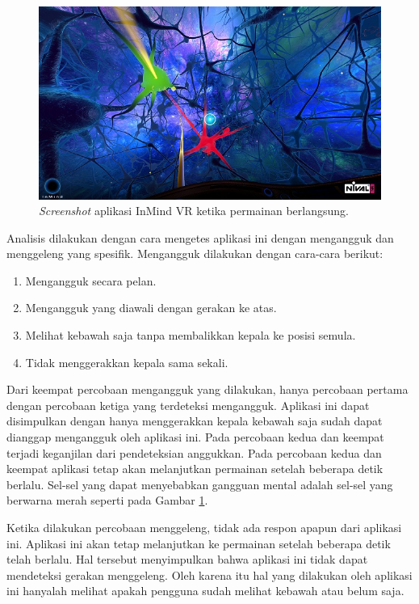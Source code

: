 \documentclass[a4paper,twoside]{article}
\begin{document}
\begin{enumerate}
\begin{figure}[htbp]
\centering
\includegraphics[scale=0.7]{Gambar/screenshot-inmind-gameplay.jpg}
\caption{\textit{Screenshot} aplikasi InMind VR ketika permainan berlangsung.}
\label{fig:screenshot_inmind_gameplay}
\end{figure}

Analisis dilakukan dengan cara mengetes aplikasi ini dengan mengangguk dan menggeleng yang spesifik. Mengangguk dilakukan dengan cara-cara berikut:
\begin{enumerate}
	\item Mengangguk secara pelan.
	\item Mengangguk yang diawali dengan gerakan ke atas.
	\item Melihat kebawah saja tanpa membalikkan kepala ke posisi semula.
	\item Tidak menggerakkan kepala sama sekali.
\end{enumerate}

Dari keempat percobaan mengangguk yang dilakukan, hanya percobaan pertama dengan percobaan ketiga yang terdeteksi mengangguk. Aplikasi ini dapat disimpulkan dengan hanya menggerakkan kepala kebawah saja sudah dapat dianggap mengangguk oleh aplikasi ini. Pada percobaan kedua dan keempat terjadi keganjilan dari pendeteksian anggukkan. Pada percobaan kedua dan keempat aplikasi tetap akan melanjutkan permainan setelah beberapa detik berlalu. Sel-sel yang dapat menyebabkan gangguan mental adalah sel-sel yang berwarna merah seperti pada Gambar \ref{fig:screenshot_inmind_gameplay}. 

Ketika dilakukan percobaan menggeleng, tidak ada respon apapun dari aplikasi ini. Aplikasi ini akan tetap melanjutkan ke permainan setelah beberapa detik telah berlalu. Hal tersebut menyimpulkan bahwa aplikasi ini tidak dapat mendeteksi gerakan menggeleng. Oleh karena itu hal yang dilakukan oleh aplikasi ini hanyalah melihat apakah pengguna sudah melihat kebawah atau belum saja.


\end{enumerate}
\end{document}
